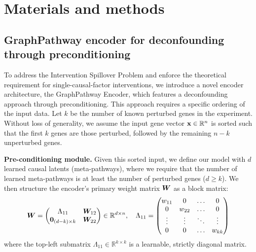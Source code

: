 \documentclass[10pt,letterpaper]{article}
\def\vzero{{\bm{0}}}\def\vone{{\bm{1}}}
\theoremstyle{definition}
\theoremstyle{remark}
\newcommand{\realnumbers}{\mathbb{R}}
\newcommand{\variables}{\rvx}
\newcommand{\weightmatrix}{\mW}
\newcommand{\observeddim}{n}
\newcommand{\latentdim}{d}
\newcommand{\numperturbedgenes}{k}
\begin{document}



\section*{Materials and methods}

\subsection*{GraphPathway encoder for deconfounding through preconditioning}
To address the Intervention Spillover Problem and enforce the theoretical requirement for single-causal-factor interventions, we introduce a novel encoder architecture, the GraphPathway Encoder, which features a deconfounding approach through preconditioning.
This approach requires a specific ordering of the input data.
Let $\numperturbedgenes$ be the number of known perturbed genes in the experiment.
Without loss of generality, we assume the input gene vector $\variables \in \realnumbers^\observeddim$ is sorted such that the first $\numperturbedgenes$ genes are those perturbed, followed by the remaining $\observeddim-\numperturbedgenes$ unperturbed genes.

\textbf{Pre-conditioning module.} Given this sorted input, we define our model with $\latentdim$ learned causal latents (meta-pathways), where we require that the number of learned meta-pathways is at least the number of perturbed genes ($\latentdim \ge \numperturbedgenes$).
We then structure the encoder's primary weight matrix $\weightmatrix$ as a block matrix:
\begin{equation}
    \weightmatrix =
    \begin{pmatrix}
        \Lambda_{11}   & \weightmatrix_{12} \\
        \vzero_{(\latentdim-\numperturbedgenes) \times \numperturbedgenes} & \weightmatrix_{22}
    \end{pmatrix}
    \in \realnumbers^{\latentdim \times \observeddim}
    , \quad
    \Lambda_{11} =
    \begin{pmatrix}
        w_{11} & 0      & \dots  & 0 \\
        0      & w_{22} & \dots  & 0 \\
        \vdots & \vdots & \ddots & \vdots \\
        0      & 0      & \dots  & w_{\numperturbedgenes\numperturbedgenes}
    \end{pmatrix}
    \label{eq:preconditioning_matrix}
\end{equation}
where the top-left submatrix $\Lambda_{11} \in \realnumbers^{\numperturbedgenes \times \numperturbedgenes}$ is a learnable, strictly diagonal matrix.
\end{document}
